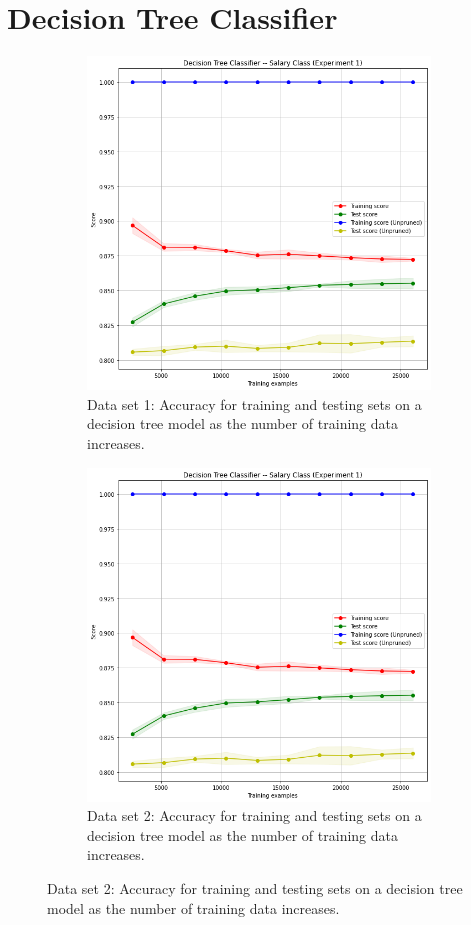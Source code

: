 \documentclass[
	letterpaper, %
]{IEEEtran}
\begin{document}
	\section{Decision Tree Classifier}
		\begin{figure}[h]
			\begin{subfigure}{.5\textwidth}
				\centering
				\includegraphics[width=.8\linewidth]{./images/dtExp1.png}
				\caption{Data set 1: Accuracy for training and testing sets on a decision tree model as the number of training data increases.}
				\label{fig:dtexp1}
			\end{subfigure}
			\begin{subfigure}{.5\textwidth}
				\centering
				\includegraphics[width=.8\linewidth]{./images/dtExp1.png}
				\caption{Data set 2: Accuracy for training and testing sets on a decision tree model as the number of training data increases.}
				\label{fig:dtexp2}
			\end{subfigure}
		\end{figure}
	
\end{document}
